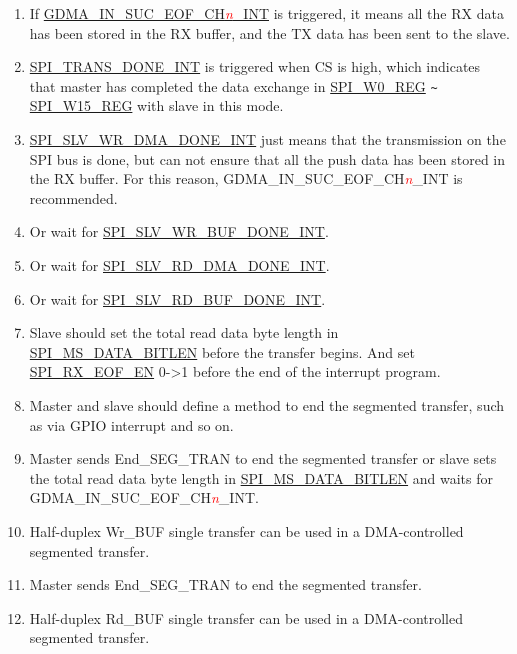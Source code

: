 \documentclass[main\_\_EN.tex]{subfiles}
\begin{document}
\begin{tiplisting}
\vspace{-2em}
\begin{enumerate}
\item If \hyperref[int:GDMAINSUCEOFINT]{GDMA\_IN\_SUC\_EOF\_CH\textcolor{red}{\it{n}}\_INT} is triggered, it means all the RX data has been stored in the RX buffer, and the TX data has been sent to the slave. \label{other:spi-item-gp-spi2-slave-interrupts-note-1}
\item \hyperref[int:SPITRANSDONEINT]{SPI\_TRANS\_DONE\_INT} is triggered when CS is high, which indicates that master has completed the data exchange in \hyperref[regdesc:SPIW0REG]{SPI\_W0\_REG}  \verb+~+ \hyperref[regdesc:SPIW15REG]{SPI\_W15\_REG} with slave in this mode.\label{other:spi-item-gp-spi2-slave-interrupts-note-2}
\item \hyperref[int:SPISLVWRDMADONEINT]{SPI\_SLV\_WR\_DMA\_DONE\_INT} just means that the transmission on the SPI bus is done, but can not ensure that all the push data has been stored in the RX buffer. For this reason, GDMA\_IN\_SUC\_EOF\_CH\textcolor{red}{\it{n}}\_INT is recommended. \label{other:spi-item-gp-spi2-slave-interrupts-note-3}
\vspace{-1em}
\item Or wait for \hyperref[int:SPISLVWRBUFDONEINT]{SPI\_SLV\_WR\_BUF\_DONE\_INT}.\label{other:spi-item-gp-spi2-slave-interrupts-note-4}
\item Or wait for \hyperref[int:SPISLVRDDMADONEINT]{SPI\_SLV\_RD\_DMA\_DONE\_INT}.\label{other:spi-item-gp-spi2-slave-interrupts-note-5}
\item Or wait for \hyperref[int:SPISLVRDBUFDONEINT]{SPI\_SLV\_RD\_BUF\_DONE\_INT}.\label{other:spi-item-gp-spi2-slave-interrupts-note-6}
\item Slave should set the total read data byte length in \hyperref[fielddesc:SPIMSDATABITLEN]{SPI\_MS\_DATA\_BITLEN} before the transfer begins. And set \hyperref[fielddesc:SPIRXEOFEN]{SPI\_RX\_EOF\_EN} 0->1 before the end of the interrupt program.\label{other:spi-item-gp-spi2-slave-interrupts-note-7}
\item Master and slave should define a method to end the segmented transfer, such as via GPIO interrupt and so on.\label{other:spi-item-gp-spi2-slave-interrupts-note-8}
\item Master sends End\_SEG\_TRAN to end the segmented transfer or slave sets the total read data byte length in \hyperref[fielddesc:SPIMSDATABITLEN]{SPI\_MS\_DATA\_BITLEN} and waits for GDMA\_IN\_SUC\_EOF\_CH\textcolor{red}{\it{n}}\_INT.\label{other:spi-item-gp-spi2-slave-interrupts-note-9}
\item Half-duplex Wr\_BUF single transfer can be used in a DMA-controlled segmented transfer.\label{other:spi-item-gp-spi2-slave-interrupts-note-10}
\item Master sends End\_SEG\_TRAN to end the segmented transfer.\label{other:spi-item-gp-spi2-slave-interrupts-note-11}
\item Half-duplex Rd\_BUF single transfer can be used in  a DMA-controlled segmented transfer.\label{other:spi-item-gp-spi2-slave-interrupts-note-12}
\end{enumerate}
\end{tiplisting}
\end{document}
